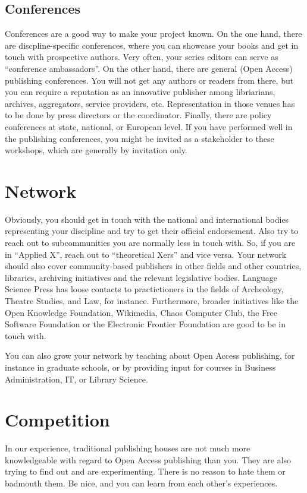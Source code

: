 \documentclass[nonflat,modfonts,output=book] {langsci/langscibook}
\begin{document}
\subsection{Conferences}
Conferences are a good way to make your project known. On the one hand, there are discpline-specific conferences, where you can showcase your books and get in touch with prospective authors. Very often, your series editors can serve as ``conference ambassadors''. On the other hand, there are general (Open Access) publishing conferences. You will not get any authors or readers from there, but you can require a reputation as an innovative publisher among libriarians, archives, aggregators, service providers, etc. Representation in those venues has to be done by press directors or the coordinator. Finally, there are policy conferences at state, national, or  European level. If you have performed well in the publishing conferences, you might be invited as a stakeholder to these workshops, which are generally by invitation only. 

\section{Network}\label{sec:network}
Obviously, you should get in touch with the national and international bodies representing your discipline and try to get their official endorsement. Also try to reach out to subcommunities you are normally less in touch with. So, if you are in ``Applied X'', reach out to ``theoretical Xers'' and vice versa. Your network should also cover community-based publishers in other fields and other countries, libraries, archiving initiatives and the relevant legislative bodies. Language Science Press has loose contacts to practictioners in the fields of Archeology, Theatre Studies, and Law, for instance. 
Furthermore, broader initiatives like the Open Knowledge Foundation, Wikimedia, Chaos Computer Club, the Free Software Foundation or the Electronic Frontier Foundation are good to be in touch with.

You can also grow your network by teaching about Open Access publishing, for instance in graduate schools, or by providing input for courses in Business Administration, IT, or Library Science. 

\section{Competition}\label{sec:competition}
In our experience, traditional publishing houses are not much more knowledgeable with regard to Open Access publishing than you. They are also trying to find out and are experimenting. There is no reason to hate them or badmouth them. Be nice, and you can learn from each other's experiences. 
\end{document}
